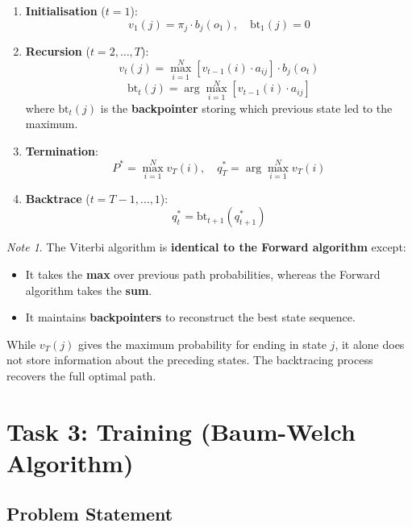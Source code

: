 \documentclass[11pt,a4paper]{article}
\theoremstyle{definition}
\theoremstyle{plain}
\theoremstyle{remark}
\newtheorem*{remark}{Note}
\begin{document}
\begin{tcolorbox}[colback=cyan!5!white,colframe=cyan!75!black,title=\textbf{Viterbi Algorithm}]
\begin{enumerate}
    \item \textbf{Initialisation} ($t = 1$):
    \[
    v_1(j) = \pi_j \cdot b_j(o_1), \quad \text{bt}_1(j) = 0
    \]

    \item \textbf{Recursion} ($t = 2, \dots, T$):
    \[
    v_t(j) = \max_{i=1}^{N} \left[ v_{t-1}(i) \cdot a_{ij} \right] \cdot b_j(o_t)
    \]
    \[
    \text{bt}_t(j) = \arg\max_{i=1}^{N} \left[ v_{t-1}(i) \cdot a_{ij} \right]
    \]
    where $\text{bt}_t(j)$ is the \textbf{backpointer} storing which previous state led to the maximum.

    \item \textbf{Termination}:
    \[
    P^* = \max_{i=1}^{N} v_T(i), \quad q_T^* = \arg\max_{i=1}^{N} v_T(i)
    \]

    \item \textbf{Backtrace} ($t = T-1, \dots, 1$):
    \[
    q_t^* = \text{bt}_{t+1}(q_{t+1}^*)
    \]
\end{enumerate}
\end{tcolorbox}

\begin{remark}
The Viterbi algorithm is \textbf{identical to the Forward algorithm} except:
\begin{itemize}
    \item It takes the \textbf{max} over previous path probabilities, whereas the Forward algorithm takes the \textbf{sum}.
    \item It maintains \textbf{backpointers} to reconstruct the best state sequence.
\end{itemize}
While $v_T(j)$ gives the maximum probability for ending in state $j$, it alone does not store information about the preceding states. The backtracing process recovers the full optimal path.
\end{remark}

\section{Task 3: Training (Baum-Welch Algorithm)}

\subsection{Problem Statement}
\end{document}
